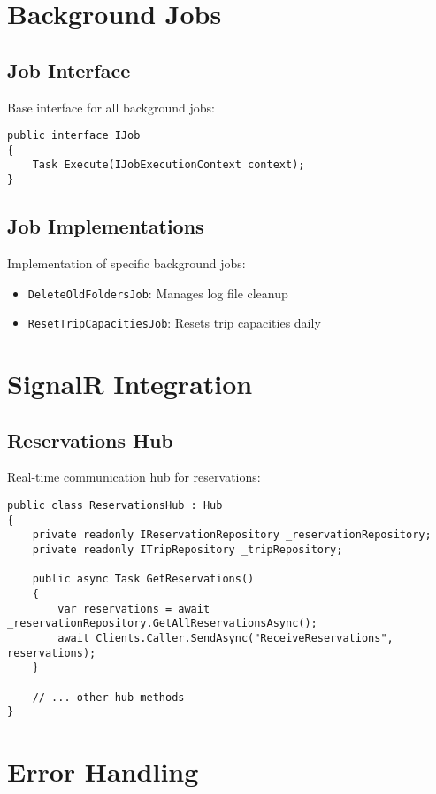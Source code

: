 \section{Background Jobs}

\subsection{Job Interface}
Base interface for all background jobs:

\begin{lstlisting}[language=CSharp]
public interface IJob
{
    Task Execute(IJobExecutionContext context);
}
\end{lstlisting}

\subsection{Job Implementations}
Implementation of specific background jobs:

\begin{itemize}
    \item \texttt{DeleteOldFoldersJob}: Manages log file cleanup
    \item \texttt{ResetTripCapacitiesJob}: Resets trip capacities daily
\end{itemize}

\section{SignalR Integration}

\subsection{Reservations Hub}
Real-time communication hub for reservations:

\begin{lstlisting}[language=CSharp]
public class ReservationsHub : Hub
{
    private readonly IReservationRepository _reservationRepository;
    private readonly ITripRepository _tripRepository;
    
    public async Task GetReservations()
    {
        var reservations = await _reservationRepository.GetAllReservationsAsync();
        await Clients.Caller.SendAsync("ReceiveReservations", reservations);
    }
    
    // ... other hub methods
}
\end{lstlisting}

\section{Error Handling}

